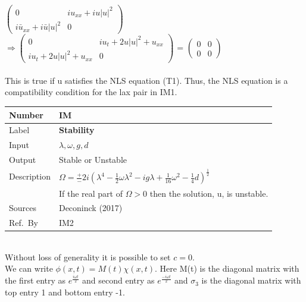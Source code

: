 \documentclass[12pt]{article}
\newcommand{\colAwidth}{0.13\textwidth}
\newcommand{\colBwidth}{0.82\textwidth}
\newcounter{instnum} %
\begin{document}
$ \begin{pmatrix} 
0 & iu_{xx} + iu|u|^{2} \\
i\bar{u}_{xx} + i \bar{u}|u|^{2} & 0
\end{pmatrix} $ \\ 
$ \Rightarrow \begin{pmatrix} 
0 & iu_{t} + 2u|u|^{2} + u_{xx} \\
iu_{t} + 2u|u|^{2} + u_{xx} & 0
\end{pmatrix} $ = 
$ \begin{pmatrix} 
0 & 0 \\
0 & 0
\end{pmatrix} $ \\ 
\\
This is true if u satisfies the NLS equation (T1). Thus, the NLS equation is a 
compatibility 
condition for the lax pair in IM1. \\

\noindent
\begin{minipage}{\textwidth}
	\renewcommand*{\arraystretch}{1.5}
	\begin{tabular}{| p{\colAwidth} | p{\colBwidth}|}
		\hline
		\rowcolor[gray]{0.9}
		Number& IM{instnum}\theinstnum \label{ewat}\\
		\hline
		Label& \bf Stability\\
		\hline
		Input &$\lambda, \omega, g, d$\\
		\hline
		Output& Stable or Unstable \\ 
		\hline
		Description& $\Omega = \frac{+}{-} 2i (\lambda^{4} - \frac{1}{2}\omega 
		\lambda^{2} - ig\lambda + \frac{1}{16}\omega^{2} - 
		\frac{1}{4}d)^{\frac{1}{2}}$ \\
		& If the real part of $\Omega > 0$  then the solution, u, 
		is unstable. \\
		\hline
		Sources& Deconinck (2017) \\
		\hline
		Ref.\ By & IM2\\
		\hline
	\end{tabular}
\end{minipage}\\

Without loss of generality it is possible to set $c=0$. \\  

We can write $\phi(x,t) = M(t) \chi (x,t) $. Here M(t) is the diagonal matrix 
with the first entry as $e^{\frac{i \omega t}{2}}$ and second entry as 
$e^{\frac{-i \omega t}{2}}$ and $\sigma_{3}$ is the diagonal matrix with top 
entry 1 and bottom entry -1.\\  
\end{document}
